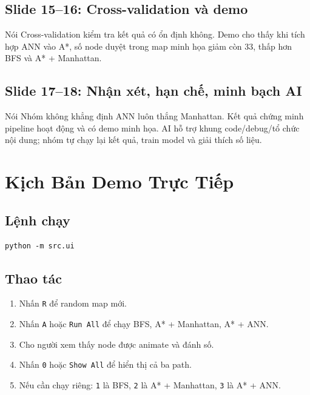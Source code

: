 \documentclass[12pt,a4paper]{article}
\newcommand{\code}[1]{\texttt{#1}}
\begin{document}
\subsection*{Slide 15--16: Cross-validation và demo}
\begin{saybox}{Nói}
Cross-validation kiểm tra kết quả có ổn định không. Demo cho thấy khi tích hợp ANN vào A*, số node duyệt trong map minh họa giảm còn 33, thấp hơn BFS và A* + Manhattan.
\end{saybox}

\subsection*{Slide 17--18: Nhận xét, hạn chế, minh bạch AI}
\begin{saybox}{Nói}
Nhóm không khẳng định ANN luôn thắng Manhattan. Kết quả chứng minh pipeline hoạt động và có demo minh họa. AI hỗ trợ khung code/debug/tổ chức nội dung; nhóm tự chạy lại kết quả, train model và giải thích số liệu.
\end{saybox}

\section{Kịch Bản Demo Trực Tiếp}

\subsection{Lệnh chạy}

\begin{lstlisting}
python -m src.ui
\end{lstlisting}

\subsection{Thao tác}

\begin{enumerate}
    \item Nhấn \code{R} để random map mới.
    \item Nhấn \code{A} hoặc \code{Run All} để chạy BFS, A* + Manhattan, A* + ANN.
    \item Cho người xem thấy node được animate và đánh số.
    \item Nhấn \code{0} hoặc \code{Show All} để hiển thị cả ba path.
    \item Nếu cần chạy riêng: \code{1} là BFS, \code{2} là A* + Manhattan, \code{3} là A* + ANN.
\end{enumerate}
\end{document}

